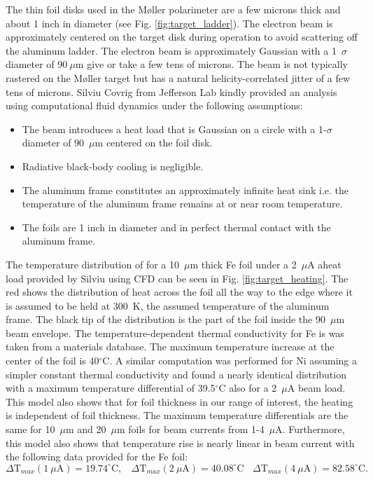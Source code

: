 \documentclass[12pt]{article}
\begin{document}
The thin foil disks used in the M\o ller polarimeter are a few microns thick and about 1 inch in diameter (see Fig. \ref{fig:target_ladder}). The electron beam is approximately centered on the target disk during operation to avoid scattering off the aluminum ladder. The electron beam is approximately Gaussian with a 1~$\sigma$ diameter of 90$~\mu$m give or take a few tens of microns. The beam is not typically rastered on the M\o ller target but has a natural helicity-correlated jitter of a few tens of microns. Silviu Covrig from Jefferson Lab kindly provided an analysis using computational fluid dynamics under the following assumptions:
\begin{itemize}
\item{The beam introduces a heat load that is Gaussian on a circle with a 1-$\sigma$ diameter of 90~$\mu$m centered on the foil disk.}
\item{Radiative black-body cooling is negligible.}
\item{The aluminum frame constitutes an approximately infinite heat sink i.e. the temperature of the aluminum frame remains at or near room temperature.}
\item{The foils are 1 inch in diameter and in perfect thermal contact with the aluminum frame.}
\end{itemize}

The temperature distribution of for a 10~$\mu$m thick Fe foil under a 2~$\mu$A aheat load provided by Silviu using CFD can be seen in Fig. \ref{fig:target_heating}. The red shows the distribution of heat across the foil all the way to the edge where it is assumed to be held at 300~K, the assumed temperature of the aluminum frame. The black tip of the distribution is the part of the foil inside the 90~$\mu$m beam envelope. The temperature-dependent thermal conductivity for Fe is was taken from a materials database. The maximum temperature increase at the center of the foil is 40$^{\circ}$C. A similar computation was performed for Ni assuming a simpler constant thermal conductivity and found a nearly identical distribution with a maximum temperature differential of 39.5$^{\circ}$C also for a 2~$\mu$A beam load. This model also shows that for foil thickness in our range of interest, the heating is independent of foil thickness. The maximum temperature differentials are the same for 10~$\mu$m and 20~$\mu$m foils for beam currents from 1-4~$\mu$A. Furthermore, this model also shows that temperature rise is nearly linear in beam current with the following data provided for the Fe foil: 
\[
\Delta \textrm{T}_{max}(1~\mu\textrm{A})=19.74^{\circ}\textrm{C},~~~~\Delta \textrm{T}_{max}(2~\mu\textrm{A})=40.08^{\circ}\textrm{C}~~~~\Delta \textrm{T}_{max}(4~\mu\textrm{A})=82.58^{\circ}\textrm{C}.
\]
\end{document}
